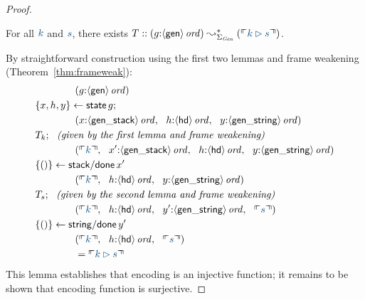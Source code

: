 \begin{proof}
\begin{lemma} For all $\obj{k}$ and $\obj{s}$, there exists
$T :: ({g{:}\istrue{\susp{\sf gen}}}) \leadsto^*_{\Sigma_{\it Gen}} 
(\ctxinterp{k \rhd s})$. 
\end{lemma}
\noindent
By straightforward construction using the first two lemmas
and frame weakening (Theorem~\ref{thm:frameweak}): 
\begin{align*}
& \qquad\qquad (g{:}\istrue{\susp{\sf gen}})\\
& \trstep{x,h,y}{{\sf state}\,g};\\
& \qquad\qquad
       (x{:}\istrue{\susp{\sf gen\_stack}},  ~~
        h{:}\istrue{\susp{\sf hd}},~~ 
        y{:}\istrue{\susp{\sf gen\_string}})\\
& T_k; ~~ \mbox{\it (given by the first lemma and frame weakening)}\\
& \qquad\qquad
       (\ctxinterp{k},  ~~
        x'{:}\istrue{\susp{\sf gen\_stack}},  ~~
        h{:}\istrue{\susp{\sf hd}}, ~~
        y{:}\istrue{\susp{\sf gen\_string}})\\
& \trstep{()}{{\sf stack/done}\,x'}\\
& \qquad\qquad
       (\ctxinterp{k},  ~~
        h{:}\istrue{\susp{\sf hd}}, ~~
        y{:}\istrue{\susp{\sf gen\_string}})\\
& T_s; ~~ \mbox{\it (given by the second lemma and frame weakening)}\\
& \qquad\qquad
       (\ctxinterp{k}, ~~
        h{:}\istrue{\susp{\sf hd}}, ~~
        y'{:}\istrue{\susp{\sf gen\_string}}, ~~
        \ctxinterp{s})\\
& \trstep{()}{{\sf string/done}\,y'}\\
& \qquad\qquad 
       (\ctxinterp{k}, ~~
        h{:}\istrue{\susp{\sf hd}}, ~~
        \ctxinterp{s}) \\
& \qquad\qquad = \ctxinterp{k \rhd s}
\end{align*}
This lemma establishes that encoding is an injective
function; it remains to be shown that encoding function is surjective. 


\end{proof}

